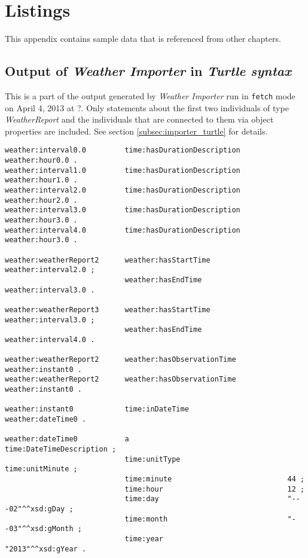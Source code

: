 \chapter{Listings}
\label{ch:listings}


This appendix contains sample data that is referenced from other chapters.

\section{Output of \emph{Weather Importer} in \emph{Turtle syntax}}
\label{sec:appendix_turtle_output}

This is a part of the output generated by \emph{Weather Importer} run in \texttt{fetch} mode on April 4, 2013 at ?. Only statements about the first two individuals of type \emph{WeatherReport} and the individuals that are connected to them via object properties are included. See section \ref{subsec:importer_turtle} for details.

\begin{lstlisting}
weather:interval0.0         time:hasDurationDescription           weather:hour0.0 .
weather:interval1.0         time:hasDurationDescription           weather:hour1.0 .
weather:interval2.0         time:hasDurationDescription           weather:hour2.0 .
weather:interval3.0         time:hasDurationDescription           weather:hour3.0 .
weather:interval4.0         time:hasDurationDescription           weather:hour3.0 .

weather:weatherReport2      weather:hasStartTime                  weather:interval2.0 ;
                            weather:hasEndTime                    weather:interval3.0 .

weather:weatherReport3      weather:hasStartTime                  weather:interval3.0 ;
                            weather:hasEndTime                    weather:interval4.0 .

weather:weatherReport2      weather:hasObservationTime            weather:instant0 .
weather:weatherReport2      weather:hasObservationTime            weather:instant0 .

weather:instant0            time:inDateTime                       weather:dateTime0 .

weather:dateTime0           a                                     time:DateTimeDescription ;
                            time:unitType                         time:unitMinute ;
                            time:minute                           44 ;
                            time:hour                             12 ;
                            time:day                              "---02"^^xsd:gDay ;
                            time:month                            "--03"^^xsd:gMonth ;
                            time:year                             "2013"^^xsd:gYear .
\end{lstlisting}
